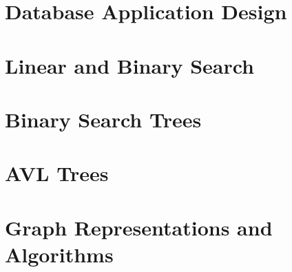 \documentclass[
  11pt,
  a4paper,
]{article}
\begin{document}
\section{Database Application Design}


\section{Linear and Binary Search}


\section{Binary Search Trees}


\section{AVL Trees}


\section{Graph Representations and Algorithms}

\end{document}
